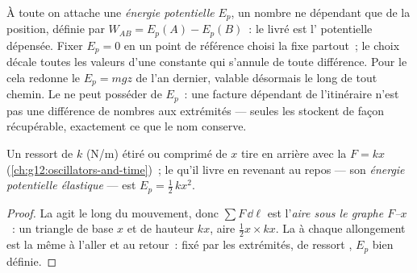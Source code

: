 \begin{definition}\label{def:g12:work-and-energy:ep}
À toute  on attache une
\emph{énergie potentielle} $E_p$, un nombre ne dépendant que de la
position, définie par $W_{AB} = E_p(A) - E_p(B)$~: le
 livré est l' potentielle dépensée.
Fixer $E_p = 0$ en un point de référence choisi la fixe partout~; le
choix décale toutes les valeurs d'une constante qui s'annule de
toute différence. Pour le  cela redonne le
$E_p = mgz$ de l'an dernier, valable désormais le long de tout
chemin. Le  ne peut posséder de $E_p$~: une facture
dépendant de l'itinéraire n'est pas une différence de nombres aux
extrémités --- seules les  stockent
de façon récupérable, exactement ce que le nom conserve.
\end{definition}

\begin{proposition}\label{prop:g12:work-and-energy:elastic}
Un ressort de  $k$ (\unit{N/m}) étiré ou comprimé
de $x$ tire en arrière avec la  $F = kx$
(\cref{ch:g12:oscillators-and-time})~; le  qu'il livre
en revenant au repos --- son
\emph{énergie potentielle élastique} --- est $E_p = \tfrac12\, k x^2$.
\end{proposition}

\begin{proof}
La  agit le long du mouvement, donc
$\sum F\,\dd\ell$ est l'\emph{aire sous le graphe $F$--$x$}~: un
triangle de base $x$ et de hauteur $kx$, aire $\tfrac12 x \times
kx$. La  à chaque allongement est la même à l'aller et
au retour~:  fixé par les extrémités,
 de ressort , $E_p$ bien
définie.
\end{proof}

